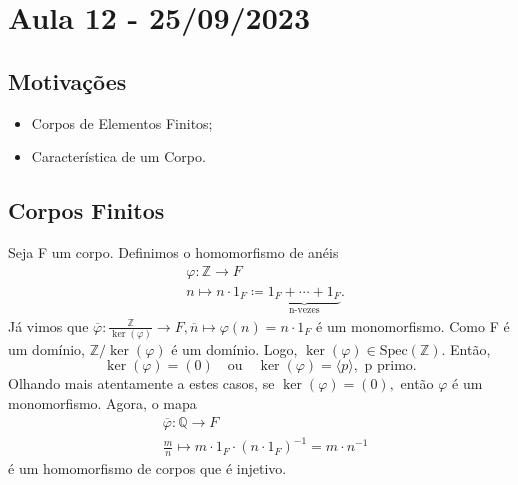 \documentclass[algebraII_notes.tex]{subfiles}
\begin{document}
\section{Aula 12 - 25/09/2023}
\subsection{Motivações}
\begin{itemize}
	\item Corpos de Elementos Finitos;
	\item Característica de um Corpo.
\end{itemize}
\subsection{Corpos Finitos}
Seja F um corpo. Definimos o homomorfismo de anéis
\begin{align*}
	 & \varphi :\mathbb{Z}\rightarrow F                                                      \\
	 & n\mapsto n \cdot 1_{F}\coloneqq \underbrace{1_{F} + \cdots + 1_{F}}_{\text{n-vezes}}.
\end{align*}
Já vimos que \(\overline{\varphi }:\frac{\mathbb{Z}}{\ker{(\varphi )}}\rightarrow F, \overline{n}\mapsto \varphi (n)=n \cdot 1_{F}\) é um monomorfismo. Como F é um
domínio, \(\mathbb{Z}/\ker{(\varphi )}\) é um domínio. Logo, \(\ker{(\varphi )}\in \mathrm{Spec}(\mathbb{Z}).\) Então,
\[
	\ker{(\varphi )} = (0)\quad\text{ou}\quad \ker{(\varphi )}=\langle p \rangle,\text{ p primo.}
\]
Olhando mais atentamente a estes casos, se \(\ker{(\varphi )} = (0),\) então \(\varphi \) é um monomorfismo. Agora,
o mapa
\begin{align*}
	 & \overline{\varphi }:\mathbb{Q}\rightarrow F                                  \\
	 & \frac{m}{n}\mapsto m \cdot 1_{F} \cdot (n \cdot 1_{F})^{-1} = m \cdot n^{-1}
\end{align*}
é um homomorfismo de corpos que é injetivo.
\end{document}
